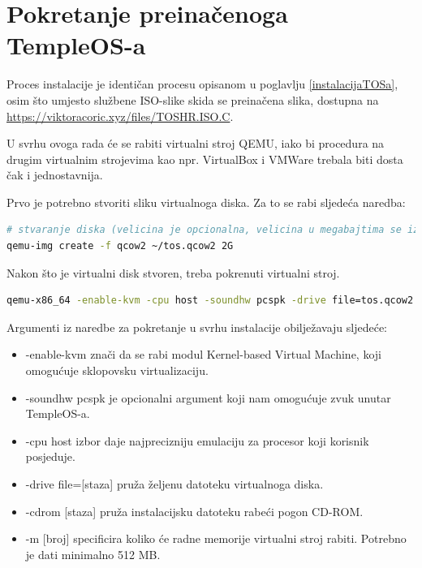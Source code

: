 \documentclass{foi}
\begin{document}
\section{Pokretanje preinačenoga TempleOS-a}

Proces instalacije je identičan procesu opisanom u poglavlju \ref{instalacijaTOSa}, osim što umjesto službene ISO-slike skida se preinačena slika, dostupna na \url{https://viktoracoric.xyz/files/TOSHR.ISO.C}.

U svrhu ovoga rada će se rabiti virtualni stroj QEMU, iako bi procedura na drugim virtualnim strojevima kao npr. VirtualBox i VMWare trebala biti dosta čak i jednostavnija.

Prvo je potrebno stvoriti sliku virtualnoga diska. Za to se rabi sljedeća naredba:

\begin{lstlisting}[language=sh,caption={Stvaranje virtualnoga diska},captionpos=b]
# stvaranje diska (velicina je opcionalna, velicina u megabajtima se izrazava u brojevima bez slova G)
qemu-img create -f qcow2 ~/tos.qcow2 2G
\end{lstlisting}

Nakon što je virtualni disk stvoren, treba pokrenuti virtualni stroj.

\begin{lstlisting}[language=sh,caption={Pokretanje virtualnoga stroja QEMU u svrhu instalacije putem naredbenoga redka},captionpos=b]
qemu-x86_64 -enable-kvm -cpu host -soundhw pcspk -drive file=tos.qcow2 -cdrom TOSHR.ISO.C -m 2G
\end{lstlisting}

Argumenti iz naredbe za pokretanje u svrhu instalacije obilježavaju sljedeće:

\begin{itemize}
    \item {\selectfont -enable-kvm} znači da se rabi modul Kernel-based Virtual Machine, koji omogućuje sklopovsku virtualizaciju.

    \item {\selectfont -soundhw pcspk} je opcionalni argument koji nam omogućuje zvuk unutar TempleOS-a.

    \item {\selectfont -cpu host} izbor daje najprecizniju emulaciju za procesor koji korisnik posjeduje.

    \item {\selectfont -drive file=[staza]} pruža željenu datoteku virtualnoga diska.

    \item {\selectfont -cdrom [staza]} pruža instalacijsku datoteku rabeći pogon CD-ROM.

    \item {\selectfont -m [broj]} specificira koliko će radne memorije virtualni stroj rabiti. Potrebno je dati minimalno 512 MB.
\end{itemize}
\end{document}

